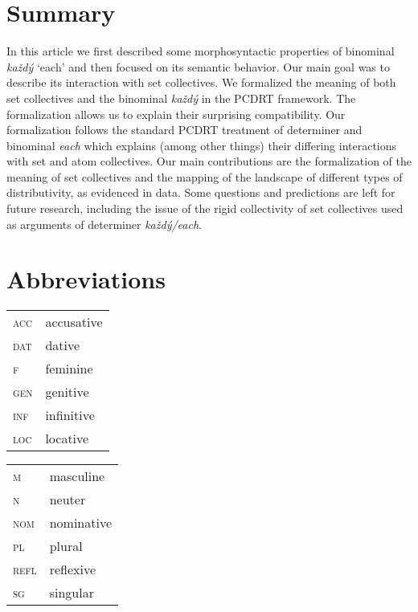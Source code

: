 \documentclass[output=paper,colorlinks,citecolor=brown,newtxmath]{langscibook}
\begin{document}
\section{Summary}\label{summary}

In this article we first described some morphosyntactic properties of  binominal \textit{každý} `each' and then focused on its semantic behavior. Our main goal was to describe its interaction with set collectives. We formalized the meaning of both set collectives and the binominal \textit{každý} in the PCDRT framework. The formalization allows us to explain their surprising compatibility. Our formalization follows the standard PCDRT treatment of determiner and binominal \textit{each} which explains (among other things) their differing interactions with set and atom collectives. Our main contributions are the formalization of the meaning of  set collectives and the mapping of the landscape of different types of distributivity, as evidenced in  data. Some questions and predictions are left for future research, including the issue of the rigid collectivity of set collectives used as arguments of determiner \textit{každý/each}.


\section*{Abbreviations}

\begin{tabularx}{.5\textwidth}{@{}lX@{}}
\textsc{acc}&accusative\\
\textsc{dat}&dative\\
\textsc{f}&feminine\\
\textsc{gen}&genitive\\
\textsc{inf}&infinitive\\
\textsc{loc}&locative\\
\end{tabularx}%
\begin{tabularx}{.5\textwidth}{@{}lX@{}}
\textsc{m}&masculine\\
\textsc{n}&neuter\\
\textsc{nom}&{nominative}\\
\textsc{pl}&{plural}\\
\textsc{refl}&reflexive\\
\textsc{sg}&singular\\
\end{tabularx}
\end{document}
